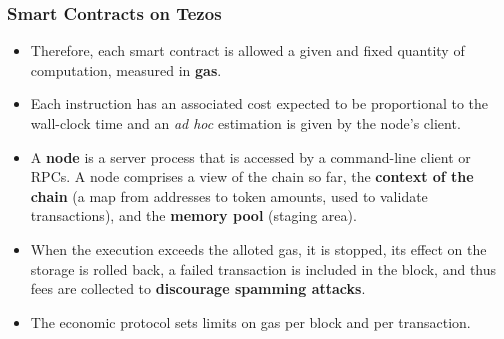 \documentclass[compress,dvips,xcolor={dvipsnames},t]{beamer}
\begin{document}
\begin{frame}
  \frametitle{Smart Contracts on Tezos}

  \begin{itemize}

    \item Therefore, each smart contract is allowed a given and fixed
      quantity of computation, measured in \textbf{gas}.

    \item Each instruction has an associated cost expected to be
      proportional to the wall-clock time and an \emph{ad hoc}
      estimation is given by the node's client.

    \item A \textbf{node} is a server process that is accessed by a
      command-line client or RPCs. A node comprises a view of the
      chain so far, the \textbf{context of the chain} (a map from
      addresses to token amounts, used to validate transactions), and
      the \textbf{memory pool} (staging area).

    \item When the execution exceeds the alloted gas, it is stopped,
      its effect on the storage is rolled back, a failed transaction
      is included in the block, and thus fees are collected to
      \textbf{discourage spamming attacks}.

    \item The economic protocol sets limits on gas per block and per
      transaction.

  \end{itemize}

\end{frame}
\end{document}

